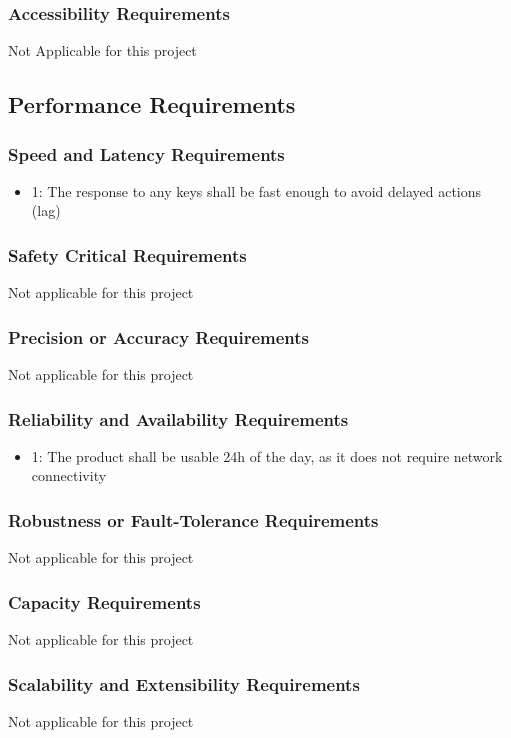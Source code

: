 \documentclass[12pt]{article}
\begin{document}
\subsubsection*{Accessibility Requirements}
Not Applicable for this project

\subsection{Performance Requirements}

\subsubsection*{Speed and Latency Requirements}
\begin{itemize}
\item 1: The response to any keys shall be fast enough to avoid delayed actions (lag)
\end{itemize}

\subsubsection*{Safety Critical Requirements}
Not applicable for this project
\subsubsection*{Precision or Accuracy Requirements}
Not applicable for this project

\subsubsection*{Reliability and Availability Requirements}
\begin{itemize}
\item 1: The product shall be usable 24h of the day, as it does not require network connectivity
\end{itemize}

\subsubsection*{Robustness or Fault-Tolerance Requirements}
Not applicable for this project
\subsubsection*{Capacity Requirements}
Not applicable for this project
\subsubsection*{Scalability and Extensibility Requirements}
Not applicable for this project
\end{document}
